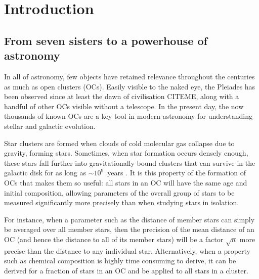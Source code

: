 %
\chapter{Introduction}
\label{sec:intro}


\section{From seven sisters to a powerhouse of astronomy}
\label{sec:intro:intro}

In all of astronomy, few objects have retained relevance throughout the centuries as much as open clusters (OCs). Easily visible to the naked eye, the Pleiades has been observed since at least the dawn of civilisation CITEME, along with a handful of other OCs visible without a telescope. In the present day, the now thousands of known OCs are a key tool in modern astronomy for understanding stellar and galactic evolution.

Star clusters are formed when clouds of cold molecular gas collapse due to gravity, forming stars. Sometimes, when star formation occurs densely enough, these stars fall further into gravitationally bound clusters that can survive in the galactic disk for as long as $\sim 10^9$~years \citep{lada_embedded_2003,portegies_zwart_young_2010}. It is this property of the formation of OCs that makes them so useful: all stars in an OC will have the same age and initial composition, allowing parameters of the overall group of stars to be measured significantly more precisely than when studying stars in isolation. 

For instance, when a parameter such as the distance of member stars can simply be averaged over all member stars, then the precision of the mean distance of an OC (and hence the distance to all of its member stars) will be a factor $\sqrt{n}$ more precise than the distance to any individual star. Alternatively, when a property such as chemical composition is highly time consuming to derive, it can be derived for a fraction of stars in an OC and be applied to all stars in a cluster.

